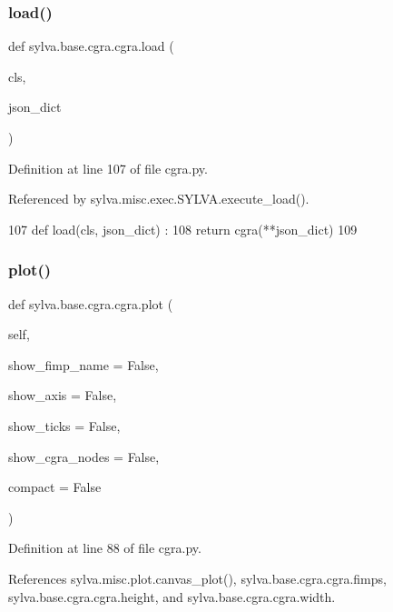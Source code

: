 \subsubsection{\texorpdfstring{load()}{load()}}
{\footnotesize\ttfamily def sylva.\+base.\+cgra.\+cgra.\+load (\begin{DoxyParamCaption}\item[{}]{cls,  }\item[{}]{json\+\_\+dict }\end{DoxyParamCaption})}



Definition at line 107 of file cgra.\+py.



Referenced by sylva.\+misc.\+exec.\+S\+Y\+L\+V\+A.\+execute\+\_\+load().


\begin{DoxyCode}
107   \textcolor{keyword}{def }load(cls, json\_dict) :
108     \textcolor{keywordflow}{return} cgra(**json\_dict)
109 
\end{DoxyCode}
\mbox{\label{classsylva_1_1base_1_1cgra_1_1cgra_a62e35aca9fe9951450c7c9619bc49725}} 
\subsubsection{\texorpdfstring{plot()}{plot()}}
{\footnotesize\ttfamily def sylva.\+base.\+cgra.\+cgra.\+plot (\begin{DoxyParamCaption}\item[{}]{self,  }\item[{}]{show\+\_\+fimp\+\_\+name = {\ttfamily False},  }\item[{}]{show\+\_\+axis = {\ttfamily False},  }\item[{}]{show\+\_\+ticks = {\ttfamily False},  }\item[{}]{show\+\_\+cgra\+\_\+nodes = {\ttfamily False},  }\item[{}]{compact = {\ttfamily False} }\end{DoxyParamCaption})}



Definition at line 88 of file cgra.\+py.



References sylva.\+misc.\+plot.\+canvas\+\_\+plot(), sylva.\+base.\+cgra.\+cgra.\+fimps, sylva.\+base.\+cgra.\+cgra.\+height, and sylva.\+base.\+cgra.\+cgra.\+width.




